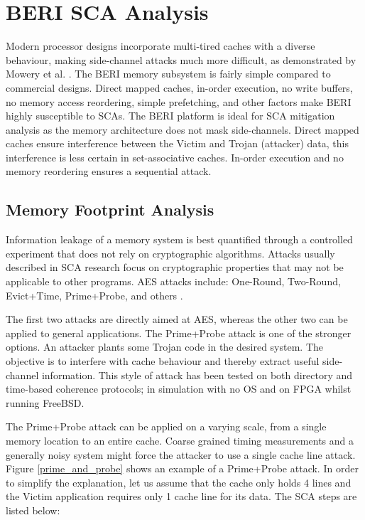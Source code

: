 \section{BERI SCA Analysis}
	Modern processor designs incorporate multi-tired caches with a diverse behaviour, making side-channel attacks much more difficult, as demonstrated by Mowery et al. \cite{Mowery12}. The BERI memory subsystem is fairly simple compared to commercial designs. Direct mapped caches, in-order execution, no write buffers, no memory access reordering, simple prefetching, and other factors make BERI highly susceptible to SCAs. The BERI platform is ideal for SCA mitigation analysis as the memory architecture does not mask side-channels. Direct mapped caches ensure interference between the Victim and Trojan (attacker) data, this interference is less certain in set-associative caches. In-order execution and no memory reordering ensures a sequential attack.

	\subsection{Memory Footprint Analysis}
		Information leakage of a memory system is best quantified through a controlled experiment that does not rely on cryptographic algorithms. Attacks usually described in SCA research focus on cryptographic properties that may not be applicable to other programs. AES attacks include: One-Round, Two-Round, Evict+Time, Prime+Probe, and others \cite{Osvik06}. 
		
		The first two attacks are directly aimed at AES, whereas the other two can be applied to general applications. The Prime+Probe attack is one of the stronger options. An attacker plants some Trojan code in the desired system. The objective is to interfere with cache behaviour and thereby extract useful side-channel information. This style of attack has been tested on both directory and time-based coherence protocols; in simulation with no OS and on FPGA whilst running FreeBSD.
		
		The Prime+Probe attack can be applied on a varying scale, from a single memory location to an entire cache. Coarse grained timing measurements and a generally noisy system might force the attacker to use a single cache line attack. Figure \ref{prime_and_probe} shows an example of a Prime+Probe attack. In order to simplify the explanation, let us assume that the cache only holds 4 lines and the Victim application requires only 1 cache line for its data. The SCA steps are listed below:
		
